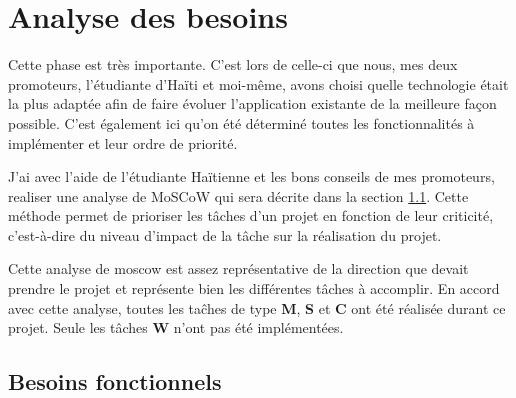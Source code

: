 \documentclass{EPL-master-thesis-covers-FR}
\begin{document}
			
			
			
			

	\chapter{Analyse des besoins}
		\label{sec:analyse_besoins}
		Cette phase est très importante. C'est lors de celle-ci que nous, mes deux promoteurs, l'étudiante d'Haïti et moi-même, avons choisi quelle technologie était la plus adaptée afin de faire évoluer l'application existante de la meilleure façon possible. C'est également ici qu'on été déterminé toutes les fonctionnalités à implémenter et leur ordre de priorité.
		
		J'ai avec l'aide de l'étudiante Haïtienne et les bons conseils de mes promoteurs, realiser une analyse de MoSCoW qui sera décrite dans la section \ref{sec:besoins_fonctionnels}. Cette méthode permet de prioriser les tâches d'un projet en fonction de leur criticité, c'est-à-dire du niveau d'impact de la tâche sur la réalisation du projet.
		
		Cette analyse de moscow est assez représentative de la direction que devait prendre le projet et représente bien les différentes tâches à accomplir. En accord avec cette analyse, toutes les taĉhes de type \textbf{M}, \textbf{S} et \textbf{C} ont été réalisée durant ce projet. Seule les tâches \textbf{W} n'ont pas été implémentées.


		\section{Besoins fonctionnels}
			\label{sec:besoins_fonctionnels}	
				
\end{document}
